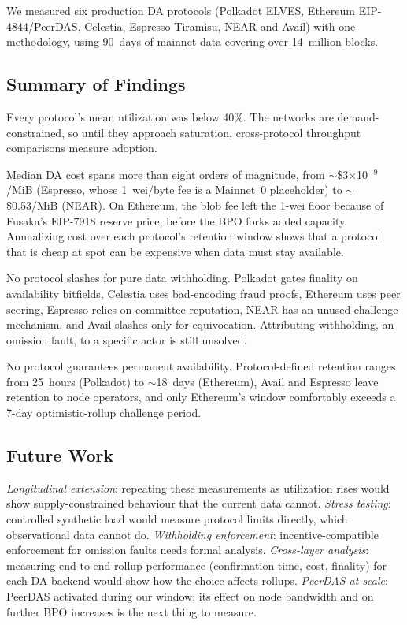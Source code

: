 
We measured six production DA protocols (Polkadot ELVES, Ethereum EIP-4844/PeerDAS, Celestia, Espresso Tiramisu, NEAR and Avail) with one methodology, using 90~days of mainnet data covering over 14~million blocks.

\subsection{Summary of Findings}

Every protocol's mean utilization was below 40\%.
The networks are demand-constrained, so until they approach saturation, cross-protocol throughput comparisons measure adoption.

Median DA cost spans more than eight orders of magnitude, from $\sim$\$3$\times$10$^{-9}$/MiB (Espresso, whose 1~wei/byte fee is a Mainnet~0 placeholder) to $\sim$\$0.53/MiB (NEAR).
On Ethereum, the blob fee left the 1-wei floor because of Fusaka's EIP-7918 reserve price, before the BPO forks added capacity.
Annualizing cost over each protocol's retention window shows that a protocol that is cheap at spot can be expensive when data must stay available.

No protocol slashes for pure data withholding.
Polkadot gates finality on availability bitfields, Celestia uses bad-encoding fraud proofs, Ethereum uses peer scoring, Espresso relies on committee reputation, NEAR has an unused challenge mechanism, and Avail slashes only for equivocation.
Attributing withholding, an omission fault, to a specific actor is still unsolved.

No protocol guarantees permanent availability.
Protocol-defined retention ranges from 25~hours (Polkadot) to $\sim$18~days (Ethereum), Avail and Espresso leave retention to node operators, and only Ethereum's window comfortably exceeds a 7-day optimistic-rollup challenge period.

\subsection{Future Work}

\emph{Longitudinal extension}: repeating these measurements as utilization rises would show supply-constrained behaviour that the current data cannot.
\emph{Stress testing}: controlled synthetic load would measure protocol limits directly, which observational data cannot do.
\emph{Withholding enforcement}: incentive-compatible enforcement for omission faults needs formal analysis.
\emph{Cross-layer analysis}: measuring end-to-end rollup performance (confirmation time, cost, finality) for each DA backend would show how the choice affects rollups.
\emph{PeerDAS at scale}: PeerDAS activated during our window; its effect on node bandwidth and on further BPO increases is the next thing to measure.
